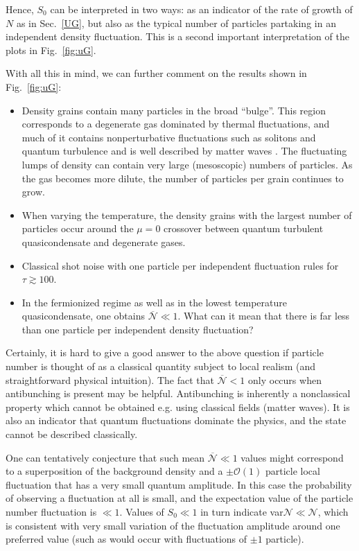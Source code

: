 \documentclass[aps,twocolumn,pra,superscriptaddress,nofootinbib,amsmath,amssymb,floats,floatfix,english]{revtex4-1}
\newcommand{\mc}[1]{{\mathcal{#1}}}
\newcommand{\wb}[1]{{\overline{#1}}}
\begin{document}
Hence, $S_0$ can be interpreted in two ways:  
as an indicator of the rate of growth of $N$ as in Sec.~\ref{UG}, but also as the typical number of particles partaking in an independent density fluctuation. 
This is a second important interpretation of the plots in Fig.~\ref{fig:uG}.

With all this in mind, we can further comment on the results shown in Fig.~\ref{fig:uG}:
\begin{itemize}
\item Density grains contain many particles in the broad ``bulge''. 
This region corresponds to a degenerate gas dominated by thermal fluctuations, and much of
it contains nonperturbative fluctuations such as solitons and quantum turbulence and is well described by matter waves \cite{Pietraszewicz17}. The fluctuating lumps of density can contain very large (mesoscopic) numbers of particles. 
As the gas becomes more dilute, the number of particles per grain 
continues to grow. 
\item When varying the temperature, the  density grains with the largest number of particles occur around the $\mu=0$ crossover between quantum turbulent quasicondensate and degenerate gases. 
\item Classical shot noise with one particle per independent fluctuation rules for $\tau\gtrsim100$.
\item In the fermionized regime as well as in the lowest temperature quasicondensate, one obtains $\wb{\mc{N}}\ll1$. 
What can it mean that  there is far less than one particle per independent density fluctuation? 
\end{itemize}

Certainly, it is hard to give a good answer to the above question if particle number is
thought of as a classical quantity subject to local realism (and straightforward physical intuition). The fact that $\wb{\mc{N}}<1$ only occurs when antibunching is present may be helpful. Antibunching is inherently 
a nonclassical property which cannot be obtained e.g. using classical fields (matter waves). It is 
also an indicator that quantum fluctuations dominate the physics, and the state cannot be described classically. 

One can tentatively conjecture that such mean $\wb{\mc{N}}\ll1$ values might correspond to a superposition of the background density and a $\pm\mc{O}(1)$ particle local fluctuation that has a very small quantum amplitude. In this case the probability of observing a fluctuation at all is small, and the expectation value of the particle number fluctuation is $\ll1$. Values of $S_0\ll1$ in turn indicate var$\mc{N}\ll\mc{N}$, which is consistent with very small variation of the fluctuation amplitude around one preferred value (such as would occur with fluctuations of $\pm1$ particle). 
\end{document}
